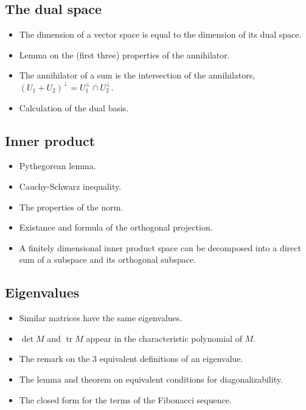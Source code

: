 \documentclass[12pt]{article}
\DeclareMathOperator{\tr}{tr}
\begin{document}
\begin{multicols}{2}
\subsection{The dual space}

\begin{itemize}
    \item The dimension of a vector space is equal to the dimension
        of its dual space.
    \item Lemma on the (first three) properties of the annihilator.
    \item The annihilator of a sum is the intersection of the
        annihilators,
        $(U_1 + U_2)^\perp = U_1^\perp \cap U_2^\perp$.
    \item Calculation of the dual basis.
\end{itemize}

\subsection{Inner product}

\begin{itemize}
    \item Pythegorean lemma.
    \item Cauchy-Schwarz inequality.
    \item The properties of the norm.
    \item Existance and formula of the orthogonal projection.
    \item A finitely dimensional inner product space can be
        decomposed into a direct sum of a subspace and its
        orthogonal subspace.
\end{itemize}


\subsection{Eigenvalues}

\begin{itemize}
    \item Similar matrices have the same eigenvalues.
    \item $\det M$ and $\tr M$ appear in the characteristic
        polynomial of $M$.
    \item The remark on the 3 equivalent definitions of an
        eigenvalue.
    \item The lemma and theorem on equivalent conditions for
        diagonalizability.
    \item The closed form for the terms of the Fibonacci sequence.
\end{itemize}


\end{multicols}
\end{document}
